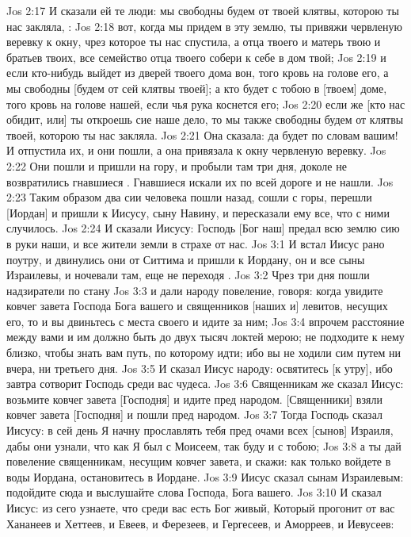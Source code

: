 \vs Jos 2:17 И сказали ей те люди: мы свободны будем от твоей клятвы, которою ты нас закляла, :
\vs Jos 2:18 вот, когда мы придем в эту землю, ты привяжи червленую веревку к окну, чрез которое ты нас спустила, а отца твоего и матерь твою и братьев твоих, все семейство отца твоего собери к себе в дом твой;
\vs Jos 2:19 и если кто-нибудь выйдет из дверей твоего дома вон, того кровь на голове его, а мы свободны [будем от сей клятвы твоей]; а кто будет с тобою в [твоем] доме, того кровь на голове нашей, если чья рука коснется его;
\vs Jos 2:20 если же [кто нас обидит, или] ты откроешь сие наше дело, то мы также свободны будем от клятвы твоей, которою ты нас закляла.
\vs Jos 2:21 Она сказала: да будет по словам вашим! И отпустила их, и они пошли, а она привязала к окну червленую веревку.
\vs Jos 2:22 Они пошли и пришли на гору, и пробыли там три дня, доколе не возвратились гнавшиеся . Гнавшиеся искали их по всей дороге и не нашли.
\vs Jos 2:23 Таким образом два сии человека пошли назад, сошли с горы, перешли [Иордан] и пришли к Иисусу, сыну Навину, и пересказали ему все, что с ними случилось.
\vs Jos 2:24 И сказали Иисусу: Господь [Бог наш] предал всю землю сию в руки наши, и все жители земли в страхе от нас.
\vs Jos 3:1 И встал Иисус рано поутру, и двинулись они от Ситтима и пришли к Иордану, он и все сыны Израилевы, и ночевали там, еще не переходя .
\vs Jos 3:2 Чрез три дня пошли надзиратели по стану
\vs Jos 3:3 и дали народу повеление, говоря: когда увидите ковчег завета Господа Бога вашего и священников [наших и] левитов, несущих его, то и вы двиньтесь с места своего и идите за ним;
\vs Jos 3:4 впрочем расстояние между вами и им должно быть до двух тысяч локтей мерою; не подходите к нему близко, чтобы знать вам путь, по которому идти; ибо вы не ходили сим путем ни вчера, ни третьего дня.
\vs Jos 3:5 И сказал Иисус народу: освятитесь [к утру], ибо завтра сотворит Господь среди вас чудеса.
\vs Jos 3:6 Священникам же сказал Иисус: возьмите ковчег завета [Господня] и идите пред народом. [Священники] взяли ковчег завета [Господня] и пошли пред народом.
\rsbpar\vs Jos 3:7 Тогда Господь сказал Иисусу: в сей день Я начну прославлять тебя пред очами всех [сынов] Израиля, дабы они узнали, что как Я был с Моисеем, так буду и с тобою;
\vs Jos 3:8 а ты дай повеление священникам, несущим ковчег завета, и скажи: как только войдете в воды Иордана, остановитесь в Иордане.
\vs Jos 3:9 Иисус сказал сынам Израилевым: подойдите сюда и выслушайте слова Господа, Бога вашего.
\vs Jos 3:10 И сказал Иисус: из сего узнаете, что среди вас есть Бог живый, Который прогонит от вас Хананеев и Хеттеев, и Евеев, и Ферезеев, и Гергесеев, и Аморреев, и Иевусеев:
